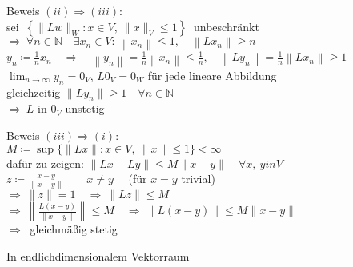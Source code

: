 \documentclass[AERbeamer%
,handout%
,optBeamerClassicFormat%
,optLeftEquations   %
]{AERlatex}
\begin{document}
%
    \begin{frame}{Beweis}
        \setlength{\baselineskip}{1.6\baselineskip}
%
        $(ii) \Rightarrow (iii)$: \\ \pause
        sei $ ~\left\{\|L w\|_W: x \in V, ~ \|x \|_V \leq 1\right\} ~$ unbeschränkt \\ \pause
        $\Rightarrow ~ \forall n \in \mathbb{N} \quad \exists x_n \in V: ~ \left\|x_n\right\| \leq 1, \quad \left\|L x_n\right\| \geq n$ \\ \pause
        $y_n \coloneqq \frac{1}{n} x_n \quad \Rightarrow \quad \left\|y_n\right\|=\frac{1}{n}\left\|x_n\right\| \leq \frac{1}{n}, \quad \left\|L y_n\right\|=\frac{1}{n}\left\|L x_n\right\| \geq 1$ \\ \pause
        $\lim _{n \rightarrow \infty} y_n=0_V$, $L 0_V=0_W$ für jede lineare Abbildung \\
        gleichzeitig $\|Ly_n\| \geq 1 \quad \forall n \in \mathbb{N}$ \\
        $\Rightarrow ~ L$ in $0_V$ unstetig
    \end{frame}
%
    \begin{frame}{Beweis}
        \setlength{\baselineskip}{1.6\baselineskip}
%
        $(iii) \Rightarrow (i)$: \\
        $M\coloneqq\sup \{\|L x\|: x \in V,~\|x\| \leq 1\}<\infty$ \\ \pause
        dafür zu zeigen: $\|L x-L y\| \leq M\|x-y\| \quad \forall x, ~ y in V$ \\ \pause
        $z\coloneqq\frac{x-y}{\|x-y\|} \qquad x \neq y \quad$ (für $x=y$ trivial) \\ \pause
        $\Rightarrow ~\|z\|=1 \quad \Rightarrow ~\|L z\| \leq M$ \\ \pause
        $\Rightarrow ~\left\|\frac{L(x-y)}{\|x-y\|}\right\| \leq M \quad \Rightarrow ~\|L(x-y)\| \leq M\|x-y\|$ \\ \pause
        $\Rightarrow ~$ gleichmäßig stetig
    \end{frame}
%
    \begin{frame}{In endlichdimensionalem Vektorraum}
    \end{frame}
%
\end{document}
